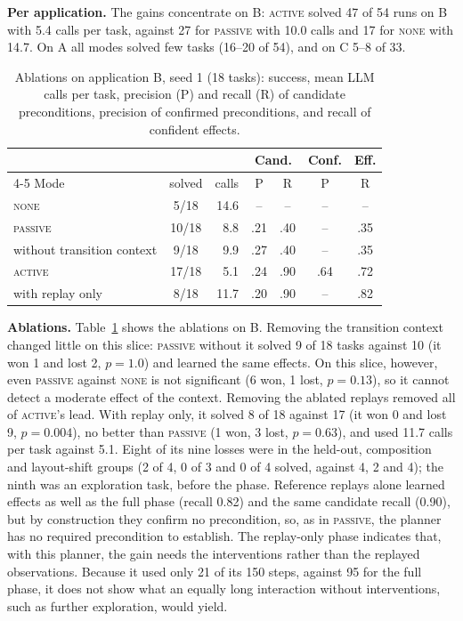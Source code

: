 \documentclass[conference]{IEEEtran}
\newcommand{\modeNone}{\textsc{none}}
\newcommand{\modePassive}{\textsc{passive}}
\newcommand{\modeActive}{\textsc{active}}
\begin{document}
\textbf{Per application.} %
The gains concentrate on B: \modeActive{} solved 47 of 54 runs on B with 5.4 calls per task, against 27 for \modePassive{} with 10.0 calls and 17 for \modeNone{} with 14.7. On A all modes solved few tasks (16--20 of 54), and on C 5--8 of 33.

\begin{table}[t]
\centering
\caption{Ablations on application B, seed 1 (18 tasks): success, mean LLM calls per task, precision (P) and recall (R) of candidate preconditions, precision of confirmed preconditions, and recall of confident effects.}
\label{tab:ablation}
\footnotesize
\setlength{\tabcolsep}{3pt}
\begin{tabular}{l c r cc c c}
\toprule
& & & \multicolumn{2}{c}{Cand.} & Conf. & Eff. \\
\cmidrule(lr){4-5}
Mode & solved & calls & P & R & P & R \\
\midrule
\modeNone                        & 5/18  & 14.6 & -- & -- & -- & -- \\
\modePassive                     & 10/18 & 8.8  & .21 & .40 & -- & .35 \\
\quad without transition context & 9/18  & 9.9  & .27 & .40 & -- & .35 \\
\modeActive                      & 17/18 & 5.1  & .24 & .90 & .64 & .72 \\
\quad with replay only           & 8/18  & 11.7 & .20 & .90 & -- & .82 \\
\bottomrule
\end{tabular}
\end{table}

\textbf{Ablations.} %
Table~\ref{tab:ablation} shows the ablations on B. Removing the transition context changed little on this slice: \modePassive{} without it solved 9 of 18 tasks against 10 (it won 1 and lost 2, $p=1.0$) and learned the same effects. On this slice, however, even \modePassive{} against \modeNone{} is not significant (6 won, 1 lost, $p=0.13$), so it cannot detect a moderate effect of the context. Removing the ablated replays removed all of \modeActive{}'s lead. With replay only, it solved 8 of 18 against 17 (it won 0 and lost 9, $p=0.004$), no better than \modePassive{} (1 won, 3 lost, $p=0.63$), and used 11.7 calls per task against 5.1. Eight of its nine losses were in the held-out, composition and layout-shift groups (2 of 4, 0 of 3 and 0 of 4 solved, against 4, 2 and 4); the ninth was an exploration task, before the phase. Reference replays alone learned effects as well as the full phase (recall 0.82) and the same candidate recall (0.90), but by construction they confirm no precondition, so, as in \modePassive{}, the planner has no required precondition to establish. The replay-only phase indicates that, with this planner, the gain needs the interventions rather than the replayed observations. Because it used only 21 of its 150 steps, against 95 for the full phase, it does not show what an equally long interaction without interventions, such as further exploration, would yield.
\end{document}
